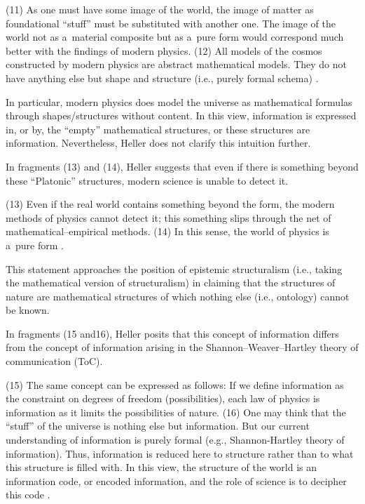 (11) As one must have some image of the world, the image of matter as foundational ``stuff'' must be substituted with another one. The image of the world not as a~material composite but as a~pure form would correspond much better with the findings of modern physics. (12) All models of the cosmos constructed by modern physics are abstract mathematical models. They do not have anything else but shape and structure (i.e., purely formal schema)
\parencite[][]{heller_ewolucja_1987}.%




In particular, modern physics does model the universe as mathematical formulas through shapes/structures without content. In this view, information is expressed in, or by, the ``empty'' mathematical structures, or these structures are information. Nevertheless, Heller does not clarify this intuition further.



In fragments (13) and (14), Heller suggests that even if there is something beyond these ``Platonic'' structures, modern science is unable to detect it.



(13) Even if the real world contains something beyond the form, the modern methods of physics cannot detect it; this something slips through the net of mathematical–empirical methods. (14) In this sense, the world of physics is a~pure form 
\parencite[][]{heller_ewolucja_1987}.%




This statement approaches the position of epistemic structuralism (i.e., taking the mathematical version of structuralism) in claiming that the structures of nature are mathematical structures of which nothing else (i.e., ontology) cannot be known.



In fragments (15 and16), Heller posits that this concept of information differs from the concept of information arising in the Shannon–Weaver–Hartley theory of communication (ToC).



(15) The same concept can be expressed as follows: If we define information as the constraint on degrees of freedom (possibilities), each law of physics is information as it limits the possibilities of nature. (16) One may think that the ``stuff'' of the universe is nothing else but information. But our current understanding of information is purely formal (e.g., Shannon-Hartley theory of information). Thus, information is reduced here to structure rather than to what this structure is filled with. In this view, the structure of the world is an information code, or encoded information, and the role of science is to decipher this code 
\parencite[][]{heller_ewolucja_1987}.%




